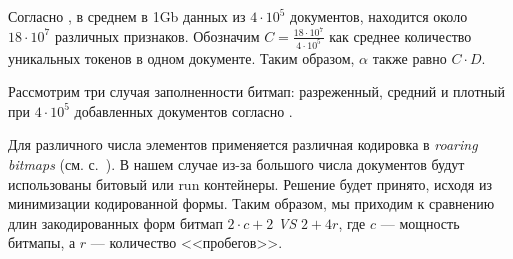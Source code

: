 Согласно \cite{Features:2020}, в среднем в 1Gb
данных из $4\cdot 10^5$ документов, находится около $18 \cdot 10^7$ различных
признаков. Обозначим $C = \frac{18 \cdot 10^7}{4\cdot 10^5}$ как среднее количество
уникальных токенов в одном документе. Таким образом, $\alpha$ также равно $C\cdot D$.

Рассмотрим три случая заполненности битмап: разреженный, средний и плотный
при $4 \cdot 10^5$ добавленных документов согласно \cite{Features:2020}.

Для различного числа элементов применяется различная кодировка в
\textit{roaring bitmaps} (см. с.~\pageref{bitmap}). В нашем случае из-за большого
числа документов будут использованы битовый или run контейнеры. Решение будет
принято, исходя из минимизации кодированной формы. Таким образом, мы приходим к
сравнению длин закодированных форм битмап $2\cdot c + 2$ \textit{VS} $2 + 4r$,
где $c$ — мощность битмапы, а $r$ — количество <<пробегов>>.

